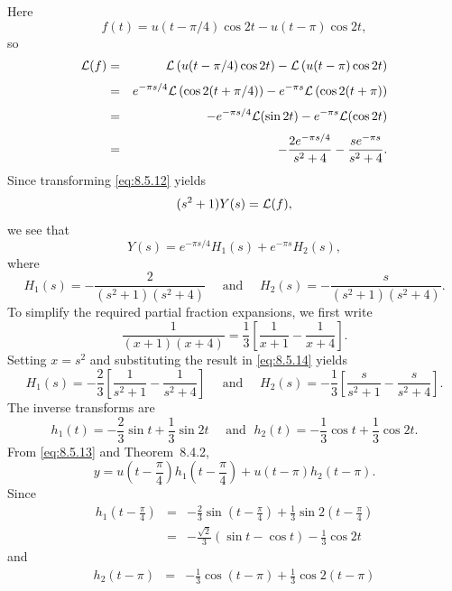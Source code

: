 \begin{examplesolution}
\solution Here
\[
  f(t)=u(t-\pi/4)\cos2t-u(t-\pi)\cos2t,
\]
so
\begin{eqnarray*}
  {\cal L}(f) & = & {\cal L}\left(u(t-\pi/4)\cos2t\right)-{\cal L}\left(u(t-\pi)\cos2t\right)                     \\[1\jot]
              & = & e^{-{\pi s/4}}{\cal L}\left(\cos2(t+\pi/4)\right)-e^{-\pi s}{\cal L}\left(\cos2(t+\pi)\right) \\[1\jot]
              & = & -e^{-{\pi s/4}}{\cal L}(\sin2t)-e^{-\pi s}{\cal L}(\cos2t)                                    \\[1\jot]
              & = & -\frac{2e^{-{\pi s/4}}}{s^{2}+4}-\frac{se^{-\pi s}}{s^{2}+4}.
\end{eqnarray*}
Since transforming \eqref{eq:8.5.12} yields
\[
  (s^{2}+1)Y(s)={\cal L}(f),
\]
we see that
\begin{equation}
  \label{eq:8.5.13}Y(s)=e^{-{\pi s/4}}H_{1}(s)+e^{-\pi s}H_{2}(s),
\end{equation}
where
\begin{equation}
  \label{eq:8.5.14}H_{1}(s)=-\frac{2}{(s^{2}+1)(s^{2}+4)}\quad\mbox{ and }\quad H_{2}(s)=-\frac{s}{(s^{2}+1)(s^{2}+4)}.
\end{equation}
To simplify the required partial fraction expansions, we first write
\[
  \frac{1}{(x+1)(x+4)}=\frac{1}{3}\left[\frac{1}{x+1}-\frac{1}{x+4}\right].
\]
Setting $x=s^{2}$ and substituting the result in \eqref{eq:8.5.14} yields
\[
  H_{1}(s)=-\frac{2}{3}\left[\frac{1}{s^{2}+1}-\frac{1}{s^{2}+4}\right] \quad\mbox{ and }\quad H_{2}(s)=-\frac{1}{3}\left[\frac{s}{s^{2}+1}-\frac{s}{s^{2}+4}\right].
\]
The inverse transforms are
\[
  h_{1}(t)=-\frac{2}{3}\sin t+\frac{1}{3}\sin2t \quad\mbox{ and }\; h_{2}(t)=-\frac{1}{3}\cos t+\frac{1}{3}\cos2t.
\]
From \eqref{eq:8.5.13} and Theorem~8.4.2,
\begin{equation}
  \label{eq:8.5.15}y=u\left(t-\frac{\pi}{4}\right)h_{1}\left(t-\frac{\pi}{4}\right)+ u(t-\pi)h_{2}(t-\pi).
\end{equation}
Since
\begin{eqnarray*}
  h_{1}\left(t-\frac{\pi}{4}\right) & = & -\frac{2}{3}\sin\left(t-\frac{\pi}{4}\right)+\frac{1}{3}\sin2\left(t-\frac{\pi}{4}\right) \\
                                    & = & -\frac{\sqrt{2}}{3}(\sin t-\cos t)-\frac{1}{3}\cos2t
\end{eqnarray*}
and
\begin{eqnarray*}
  h_{2}(t-\pi) & = & -\frac{1}{3}\cos(t-\pi)+\frac{1}{3}\cos2(t-\pi) \\

\end{eqnarray*}
\end{examplesolution}
